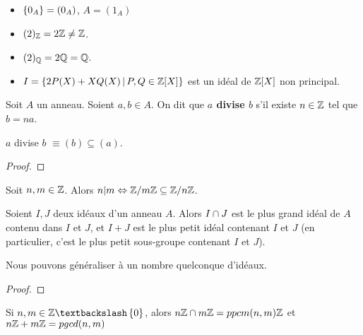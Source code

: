\begin{exemple}
	\begin{itemize}
		\item $\left\{ 0_{A} \right\} = (0_{A})$, $A = (1_{A})$
		\item $(2)_{\mathbb{Z}} = 2\mathbb{Z} \neq \mathbb{Z}$.
		\item $(2)_{\mathbb{Q}} = 2\mathbb{Q} = \mathbb{Q}$.
		\item $I = \left\{2 P(X) + X Q(X) \, | \, P, Q \in \mathbb{Z}[X] \right\}$ est un
			idéal de $\mathbb{Z}[X]$ non principal.
	\end{itemize}
\end{exemple}

\begin{definition}
	Soit $A$ un anneau. Soient $a, b \in A$. On dit que \textbf{$a$ divise $b$}
	s'il existe $n \in \mathbb{Z}$ tel que $b = na$.
\end{definition}

\begin{proposition}
	$a$ divise $b$ $\equiv (b) \subseteq (a)$.
\end{proposition}

\ifdefined\outputproof
\begin{proof}

\end{proof}
\fi

\begin{exemple}
	Soit $n, m \in \mathbb{Z}$. Alors $n | m \Leftrightarrow \mathbb{Z}/m\mathbb{Z} \subseteq
	\mathbb{Z}/n\mathbb{Z}$.
\end{exemple}

\begin{proposition}
	Soient $I, J$ deux idéaux d'un anneau $A$. Alors $I \cap J$ est le plus
	grand idéal de $A$ contenu dans $I$ et $J$, et $I + J$ est le plus petit
	idéal contenant $I$ et $J$ (en particulier, c'est le plus petit sous-groupe
	contenant $I$ et $J$).

	Nous pouvons généraliser à un nombre quelconque d'idéaux.
\end{proposition}

\ifdefined\outputproof
\begin{proof}

\end{proof}
\fi

\begin{proposition}
	Si $n, m \in \integer \textbackslash \GSset{0}$, alors $n\mathbb{Z} \cap
	m\mathbb{Z} = ppcm(n, m)\mathbb{Z}$ et $n\mathbb{Z} + m\mathbb{Z} = pgcd(n, m)$
\end{proposition}

